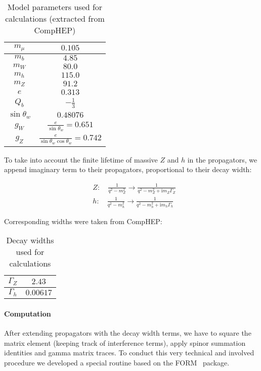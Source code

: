 \documentclass{article}
\newcommand{\ii}{\mathrm{i}}
\begin{document}
\begin{table}[H]
    \centering
    \caption{Model parameters used for calculations (extracted from CompHEP)}%
    \label{tab:params}
    \begin{tabular}{cc}
        \toprule
        $m_\mu$ & $ 0.105 $ \\ \midrule
        $m_b$ & $ 4.85 $ \\ \midrule
        $m_W$ & $ 80.0 $ \\ \midrule
        $m_h$ & $ 115.0 $ \\ \midrule
        $m_Z$ & $ 91.2 $ \\ \midrule
        $e$ & $ 0.313 $ \\ \midrule
        $Q_b$ & $ -\frac{1}{3} $ \\ \midrule
        $\sin{\theta_w}$ & $ 0.48076 $ \\ \midrule
        $g_W$ & $\frac{e}{\sin{\theta_w}} = 0.651 $ \\ \midrule
        $g_Z$ & $\frac{e}{\sin{\theta_w} \cos{\theta_w}} = 0.742 $ \\
        \bottomrule
    \end{tabular}
\end{table}

To take into account the finite lifetime of massive $Z$ and $h$ in the propagators, we append imaginary term to their propagators, proportional to their decay width:

\begin{align}
    & Z: \quad \frac{1}{q^2 - m_Z^2} \rightarrow \frac{1}{q^2 - m_Z^2 + \ii m_Z \Gamma_Z} \\
    & h: \quad \frac{1}{q^2 - m_h^2} \rightarrow \frac{1}{q^2 - m_h^2 + \ii m_h \Gamma_h}
\end{align}

Corresponding widths were taken from CompHEP\@:

\begin{table}[H]
    \centering
    \caption{Decay widths used for calculations}%
    \label{tab:widths}
    \begin{tabular}{cc}
        \toprule
        $\Gamma_Z$ & $ 2.43 $ \\ \midrule
        $\Gamma_h$ & $ 0.00617 $ \\
        \bottomrule
    \end{tabular}
\end{table}

\paragraph{Computation} After extending propagators with the decay width terms, we have to square the matrix element (keeping track of interference terms), apply spinor summation identities and gamma matrix traces. To conduct this very technical and involved procedure we developed a special routine based on the FORM~\cite{url:form} package.
\end{document}
